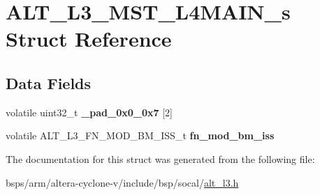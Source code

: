 \hypertarget{structALT__L3__MST__L4MAIN__s}{}\section{A\+L\+T\+\_\+\+L3\+\_\+\+M\+S\+T\+\_\+\+L4\+M\+A\+I\+N\+\_\+s Struct Reference}
\label{structALT__L3__MST__L4MAIN__s}
\subsection*{Data Fields}
\begin{DoxyCompactItemize}
\item 
\mbox{\label{structALT__L3__MST__L4MAIN__s_ac00e28f2c96e6623aa572a6b041bcff9}} 
volatile uint32\+\_\+t {\bfseries \+\_\+pad\+\_\+0x0\+\_\+0x7} \mbox{[}2\mbox{]}
\item 
\mbox{\label{structALT__L3__MST__L4MAIN__s_a18a63f279d67d436189a0daa462c1f83}} 
volatile A\+L\+T\+\_\+\+L3\+\_\+\+F\+N\+\_\+\+M\+O\+D\+\_\+\+B\+M\+\_\+\+I\+S\+S\+\_\+t {\bfseries fn\+\_\+mod\+\_\+bm\+\_\+iss}
\end{DoxyCompactItemize}


The documentation for this struct was generated from the following file\+:\begin{DoxyCompactItemize}
\item 
bsps/arm/altera-\/cyclone-\/v/include/bsp/socal/\mbox{\hyperlink{alt__l3_8h}{alt\+\_\+l3.\+h}}\end{DoxyCompactItemize}
